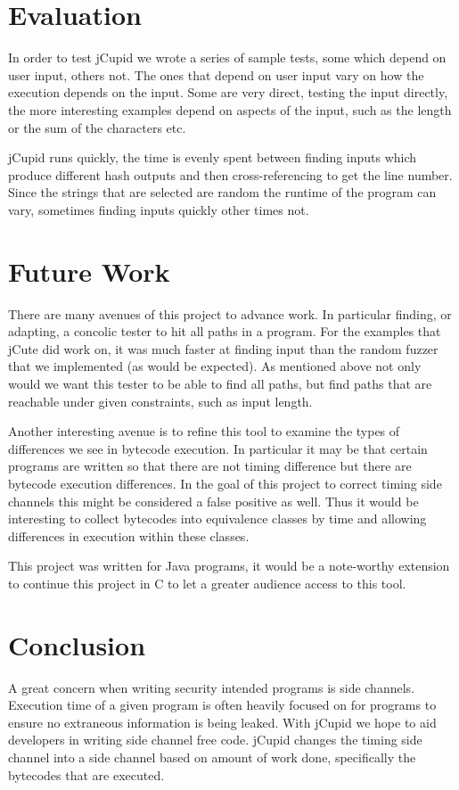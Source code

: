 \documentclass[letterpaper,twocolumn,10pt]{article}
\begin{document}
\section{Evaluation}
In order to test jCupid we wrote a series of sample tests, some which depend on user input, others not. The ones that depend on user input vary on how the execution depends on the input. Some are very direct, testing the input directly, the more interesting examples depend on aspects of the input, such as the length or the sum of the characters etc.

jCupid runs quickly, the time is evenly spent between finding inputs which produce different hash outputs and then cross-referencing to get the line number. Since the strings that are selected are random the runtime of the program can vary, sometimes finding inputs quickly other times not.

\section{Future Work}

There are many avenues of this project to advance work. In particular finding, or adapting, a concolic tester to hit all paths in a program. For the examples that jCute did work on, it was much faster at finding input than the random fuzzer that we implemented (as would be expected). As mentioned above not only would we want this tester to be able to find all paths, but find paths that are reachable under given constraints, such as input length.

Another interesting avenue is to refine this tool to examine the types of differences we see in bytecode execution. In particular it may be that certain programs are written so that there are not timing difference but there are bytecode execution differences. In the goal of this project to correct timing side channels this might be considered a false positive as well. Thus it would be interesting to collect bytecodes into equivalence classes by time and allowing differences in execution within these classes.

This project was written for Java programs, it would be a note-worthy extension to continue this project in C to let a greater audience access to this tool.

\section{Conclusion}

A great concern when writing security intended programs is side channels. Execution time of a given program is often heavily focused on for programs to ensure no extraneous information is being leaked. With jCupid we hope to aid developers in writing side channel free code. jCupid changes the timing side channel into a side channel based on amount of work done, specifically the bytecodes that are executed. 
\end{document}
